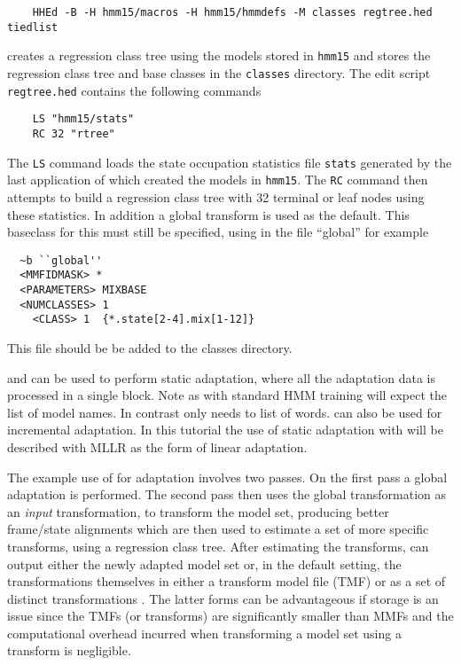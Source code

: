 \begin{verbatim}
    HHEd -B -H hmm15/macros -H hmm15/hmmdefs -M classes regtree.hed tiedlist
\end{verbatim}

\noindent
creates a regression class tree using the models stored in
\texttt{hmm15} and stores the regression class tree and base classes
in the \texttt{classes} directory.  The  edit script
\texttt{regtree.hed} contains the following commands

\begin{verbatim}
    LS "hmm15/stats"
    RC 32 "rtree"
\end{verbatim}


\noindent
The \texttt{LS} command loads the state 
occupation statistics file 
\texttt{stats} generated by the last application of  which 
created the models in \texttt{hmm15}. 
The \texttt{RC} command then attempts to build 
a regression class tree with 32 terminal or leaf nodes using these statistics.
In addition a global transform is used as the default. This baseclass for this
must still be specified, using in the file ``global'' for example

\begin{verbatim}
  ~b ``global''
  <MMFIDMASK> *
  <PARAMETERS> MIXBASE
  <NUMCLASSES> 1
    <CLASS> 1  {*.state[2-4].mix[1-12]}      

\end{verbatim}
This file should be be added to the classes directory.
 
 and  can be used to perform static adaptation, where all the
adaptation data is processed in a single block. Note as with standard HMM
training  will expect the list of model names. In contrast 
 only needs to list of words.  can also be used
for incremental adaptation. In this tutorial the use of static 
adaptation with  will be described with MLLR as the form
of linear adaptation.

The example use of  for adaptation involves two
passes. On the first pass a global adaptation is performed. The second
pass then uses the global transformation as an {\em input}
transformation, to transform the model set, producing better
frame/state alignments which are then used to estimate a set of more
specific transforms, using a regression class tree.  After estimating
the transforms,  can output either the newly adapted
model set or, in the default setting, the transformations themselves
in either a transform model file (TMF) or as a set of distinct transformations .  The latter
forms can be advantageous if storage is an issue since the TMFs (or
transforms) are
significantly smaller than MMFs and the computational overhead
incurred when transforming a model set using a transform is negligible.
 
